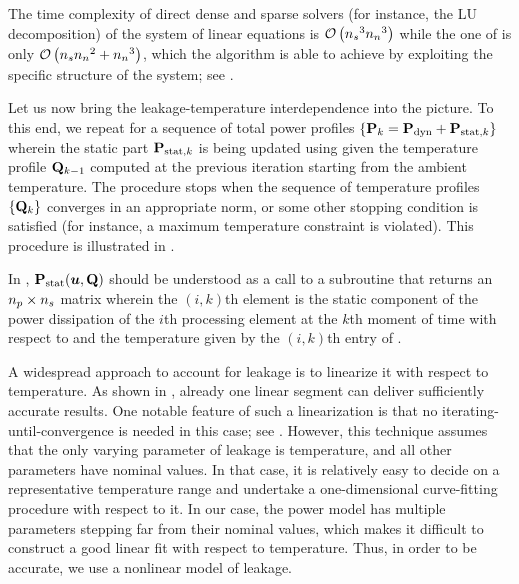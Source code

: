 \begin{remark}
The time complexity of  direct dense and sparse solvers (for instance, the LU
decomposition) of the system of linear equations is $\mathcal{O}\left({n_{s}}^3 {n_{n}}^3\right)$ while
the one of  is only $\mathcal{O}\left({n_{s}} {n_{n}}^2
+ {n_{n}}^3\right)$, which the algorithm is able to achieve by exploiting the specific
structure of the system; see \cite{ukhov2012}.
\end{remark}

Let us now bring the leakage-temperature interdependence into the picture. To
this end, we repeat  for a sequence
of total power profiles $\{ \mathbf{P}_k = \mathbf{P}_{\mathrm{dyn}} + \mathbf{P}_{\mathrm{stat}, k} \}$ wherein
the static part $\mathbf{P}_{\mathrm{stat}, k}$ is being updated using 
given the temperature profile $\mathbf{Q}_{k - 1}$ computed at the previous iteration
starting from the ambient temperature. The procedure stops when the sequence of
temperature profiles $\{ \mathbf{Q}_k \}$ converges in an appropriate norm, or some
other stopping condition is satisfied (for instance, a maximum temperature
constraint is violated). This procedure is illustrated in
.

In , $\mathbf{P}_{\mathrm{stat}}(\boldsymbol{u}, \mathbf{Q})$ should be understood as
a call to a subroutine that returns an ${n_{p}} \times {n_{s}}$ matrix wherein the $(i,
k)$th element is the static component of the power dissipation of the $i$th
processing element at the $k$th moment of time with respect to \vu and the
temperature given by the $(i, k)$th entry of \mq.

\begin{remark}
A widespread approach to account for leakage is to linearize it with respect to
temperature. As shown in \cite{liu2007}, already one linear segment can deliver
sufficiently accurate results. One notable feature of such a linearization is
that no iterating-until-convergence is needed in this case; see
\cite{ukhov2012}. However, this technique assumes that the only varying
parameter of leakage is temperature, and all other parameters have nominal
values. In that case, it is relatively easy to decide on a representative
temperature range and undertake a one-dimensional curve-fitting procedure with
respect to it. In our case, the power model has multiple parameters stepping far
from their nominal values, which makes it difficult to construct a good linear
fit with respect to temperature. Thus, in order to be accurate, we use a
nonlinear model of leakage.
\end{remark}

